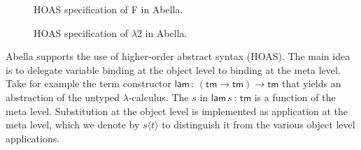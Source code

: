 \documentclass[a4paper,UKenglish]{lipics-v2016}
\newcommand{\ms}{\,}
\newcommand{\mrel}[1]{\mathrel{\ms #1 \ms}}
\newcommand{\OF}{\mrel{:}}
\newcommand{\SysL}{$\lambda$2\xspace}
\newcommand{\istyFh}[1]{\ensuremath{#1\ms\mathsf{ty}}}
\newcommand{\typingFh}[2]{\ensuremath{#1 \mathbin{:_{F}} #2}}
\newcommand{\sortLh}[1]{\ensuremath{\mathcal{S}\ms#1}}
\newcommand{\typingLh}[2]{\ensuremath{#1 \mathbin{:_{\lambda}} #2}}
\newcommand{\lpPi}[1]{\mathbf{\Pi} #1.\ms\ms}
\newcommand{\lpApp}[2]{#1\langle#2\rangle}
\newcommand{\lpImp}{\mrel{=\!\blacktriangleright}}
\newcommand{\Prp}{\ensuremath{\textrm{\textasteriskcentered}}}
\newcommand{\Typ}{\ensuremath{\square}}
\newcommand{\All}{\ensuremath{\forall.\,}}
\newcommand{\Lam}[1]{\ensuremath{\lambda #1.\,}}
\newcommand{\TyLam}{\ensuremath{\Lambda.\,}}
\newcommand{\Prod}[1]{\ensuremath{\Pi #1.\,}}
\theoremstyle{plain}
\begin{document}
\begin{figure}
  \begin{center}
  \end{center}
  \caption{HOAS specification of F in Abella.}
  \label{fig:sys-f-abella}
\end{figure}

\begin{figure}
  \begin{center}
  \end{center}
  \caption{HOAS specification of \SysL in Abella.}
  \label{fig:sys-l-abella}
\end{figure}

Abella supports the use of higher-order abstract syntax (HOAS).
The main idea is to delegate variable binding at the object level to binding at the meta level.
Take for example the term constructor $\mathsf{lam} \OF (\mathsf{tm} \to \mathsf{tm}) \to \mathsf{tm}$ that yields an abstraction of the untyped $\lambda$-calculus.
The $s$ in $\mathsf{lam}\,s \OF \mathsf{tm}$ is a function of the meta level.
Substitution at the object level is implemented as application at the meta level, which we denote by $\lpApp{s}{t}$ to distinguish it from the various object level applications.
\end{document}
